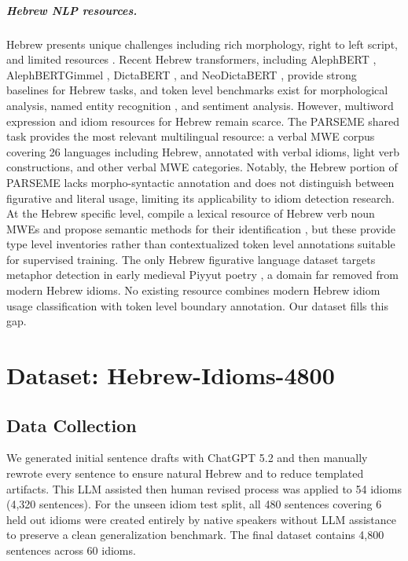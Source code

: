 \documentclass[11pt, a4paper]{report}
\begin{document}
\paragraph{Hebrew NLP resources.}
Hebrew presents unique challenges including rich morphology, right to left script, and limited resources \citep{wintner2014hebrew,tsarfaty2019whats}. Recent Hebrew transformers, including AlephBERT \citep{seker2022alephbert}, AlephBERTGimmel \citep{gueta2023alephbertgimmel}, DictaBERT \citep{shmidman2023dictabert}, and NeoDictaBERT \citep{shmidman2025neodictabert}, provide strong baselines for Hebrew tasks, and token level benchmarks exist for morphological analysis, named entity recognition \citep{bareket2021nemo}, and sentiment analysis. However, multiword expression and idiom resources for Hebrew remain scarce. The PARSEME shared task \citep{savary2023parseme13} provides the most relevant multilingual resource: a verbal MWE corpus covering 26 languages including Hebrew, annotated with verbal idioms, light verb constructions, and other verbal MWE categories. Notably, the Hebrew portion of PARSEME lacks morpho-syntactic annotation and does not distinguish between figurative and literal usage, limiting its applicability to idiom detection research. At the Hebrew specific level, \citet{liebeskind2016lexical} compile a lexical resource of Hebrew verb noun MWEs and propose semantic methods for their identification \citep{liebeskind2016identification}, but these provide type level inventories rather than contextualized token level annotations suitable for supervised training. The only Hebrew figurative language dataset targets metaphor detection in early medieval Piyyut poetry \citep{toker2024metaphor}, a domain far removed from modern Hebrew idioms. No existing resource combines modern Hebrew idiom usage classification with token level boundary annotation. Our dataset fills this gap.


\chapter{Dataset: Hebrew-Idioms-4800}

\section{Data Collection}

We generated initial sentence drafts with ChatGPT 5.2 and then manually rewrote every sentence to ensure natural Hebrew and to reduce templated artifacts. This LLM assisted then human revised process was applied to 54 idioms (4,320 sentences). For the unseen idiom test split, all 480 sentences covering 6 held out idioms were created entirely by native speakers without LLM assistance to preserve a clean generalization benchmark. The final dataset contains 4,800 sentences across 60 idioms.
\end{document}
